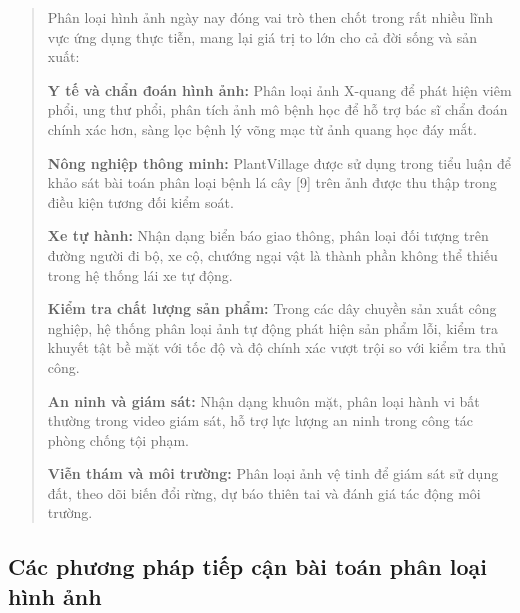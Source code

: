 \documentclass[
  12pt,
  a4paper,
]{report}
\begin{document}
\begin{quote}
Phân loại hình ảnh ngày nay đóng vai trò then chốt trong rất nhiều lĩnh
vực ứng dụng thực tiễn, mang lại giá trị to lớn cho cả đời sống và sản
xuất:

\textbf{Y tế và chẩn đoán hình ảnh:} Phân loại ảnh X-quang để phát hiện
viêm phổi, ung thư phổi, phân tích ảnh mô bệnh học để hỗ trợ bác sĩ chẩn
đoán chính xác hơn, sàng lọc bệnh lý võng mạc từ ảnh quang học đáy mắt.

\textbf{Nông nghiệp thông minh:} PlantVillage được sử dụng trong tiểu
luận để khảo sát bài toán phân loại bệnh lá cây {[}9{]} trên ảnh được
thu thập trong điều kiện tương đối kiểm soát.

\textbf{Xe tự hành:} Nhận dạng biển báo giao thông, phân loại đối tượng
trên đường người đi bộ, xe cộ, chướng ngại vật là thành phần không thể
thiếu trong hệ thống lái xe tự động.

\textbf{Kiểm tra chất lượng sản phẩm:} Trong các dây chuyền sản xuất
công nghiệp, hệ thống phân loại ảnh tự động phát hiện sản phẩm lỗi, kiểm
tra khuyết tật bề mặt với tốc độ và độ chính xác vượt trội so với kiểm
tra thủ công.

\textbf{An ninh và giám sát:} Nhận dạng khuôn mặt, phân loại hành vi bất
thường trong video giám sát, hỗ trợ lực lượng an ninh trong công tác
phòng chống tội phạm.

\textbf{Viễn thám và môi trường:} Phân loại ảnh vệ tinh để giám sát sử
dụng đất, theo dõi biến đổi rừng, dự báo thiên tai và đánh giá tác động
môi trường.
\end{quote}

\subsection{Các phương pháp tiếp cận bài toán phân loại hình
ảnh}\label{cuxe1c-phux1b0ux1a1ng-phuxe1p-tiux1ebfp-cux1eadn-buxe0i-touxe1n-phuxe2n-loux1ea1i-huxecnh-ux1ea3nh}
\end{document}
